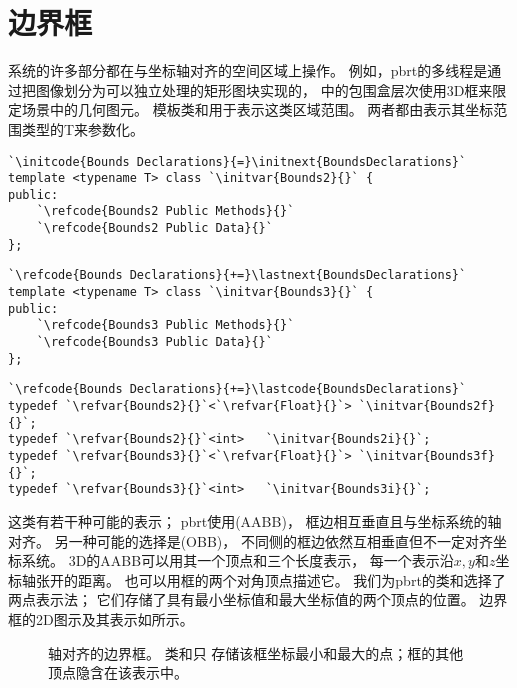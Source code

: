 \section{边界框}\label{sec:边界框}

系统的许多部分都在与坐标轴对齐的空间区域上操作。
例如，pbrt的多线程是通过把图像划分为可以独立处理的矩形图块实现的，
中的包围盒层次使用3D框来限定场景中的几何图元。
模板类和用于表示这类区域范围。
两者都由表示其坐标范围类型的{\ttfamily T}来参数化。
\begin{lstlisting}
`\initcode{Bounds Declarations}{=}\initnext{BoundsDeclarations}`
template <typename T> class `\initvar{Bounds2}{}` {
public:
    `\refcode{Bounds2 Public Methods}{}`
    `\refcode{Bounds2 Public Data}{}`
};
\end{lstlisting}
\begin{lstlisting}
`\refcode{Bounds Declarations}{+=}\lastnext{BoundsDeclarations}`
template <typename T> class `\initvar{Bounds3}{}` {
public:
    `\refcode{Bounds3 Public Methods}{}`
    `\refcode{Bounds3 Public Data}{}`
};
\end{lstlisting}
\begin{lstlisting}
`\refcode{Bounds Declarations}{+=}\lastcode{BoundsDeclarations}`
typedef `\refvar{Bounds2}{}`<`\refvar{Float}{}`> `\initvar{Bounds2f}{}`;
typedef `\refvar{Bounds2}{}`<int>   `\initvar{Bounds2i}{}`;
typedef `\refvar{Bounds3}{}`<`\refvar{Float}{}`> `\initvar{Bounds3f}{}`;
typedef `\refvar{Bounds3}{}`<int>   `\initvar{Bounds3i}{}`;
\end{lstlisting}

这类有若干种可能的表示；
pbrt使用(AABB)，
框边相互垂直且与坐标系统的轴对齐。
另一种可能的选择是(OBB)，
不同侧的框边依然互相垂直但不一定对齐坐标系统。
3D的AABB可以用其一个顶点和三个长度表示，
每一个表示沿$x,y$和$z$坐标轴张开的距离。
也可以用框的两个对角顶点描述它。
我们为pbrt的类和选择了两点表示法；
它们存储了具有最小坐标值和最大坐标值的两个顶点的位置。
边界框的2D图示及其表示如所示。
\begin{figure}[htbp]
    \centering
    \caption{轴对齐的边界框。
        类\protect{}和\protect{}只
        存储该框坐标最小和最大的点；框的其他顶点隐含在该表示中。}
    \label{fig:2.8}
\end{figure}

